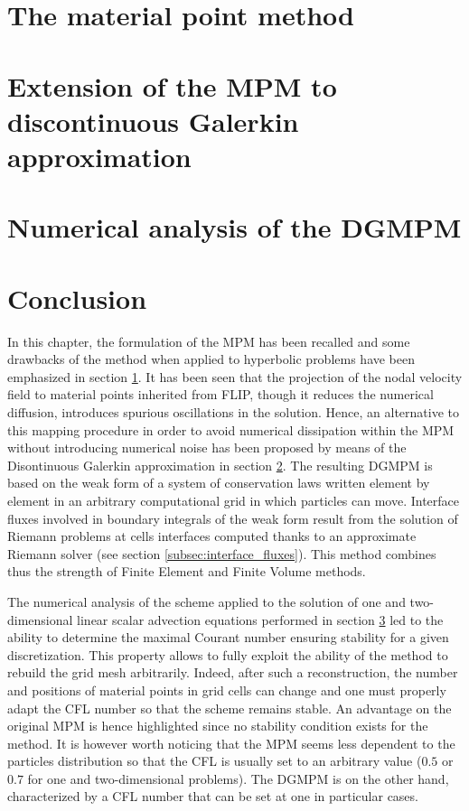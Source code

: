 \section{The material point method}
\label{sec:MPM}


\section{Extension of the MPM to discontinuous Galerkin approximation}
\label{sec:DGMPM}


\section{Numerical analysis of the DGMPM}
\label{sec:DGMPM_analysis}


\section*{Conclusion}
In this chapter, the formulation of the MPM has been recalled and some drawbacks of the method when applied to hyperbolic problems have been emphasized in section \ref{sec:MPM}. It has been seen that the projection of the nodal velocity field to material points inherited from FLIP, though it reduces the numerical diffusion, introduces spurious oscillations in the solution. Hence, an alternative to this mapping procedure in order to avoid numerical dissipation within the MPM without introducing numerical noise has been proposed by means of the Disontinuous Galerkin approximation in section \ref{sec:DGMPM}. The resulting DGMPM is based on the weak form of a system of conservation laws written element by element in an arbitrary computational grid in which particles can move. Interface fluxes involved in boundary integrals of the weak form result from the solution of Riemann problems at cells interfaces computed thanks to an approximate Riemann solver (see section \ref{subsec:interface_fluxes}). This method combines thus the strength of Finite Element and Finite Volume methods.

The numerical analysis of the scheme applied to the solution of one and two-dimensional linear scalar advection equations performed in section \ref{sec:DGMPM_analysis} led to the ability to determine the maximal Courant number ensuring stability for a given discretization.
This property allows to fully exploit the ability of the method to rebuild the grid mesh arbitrarily. Indeed, after such a reconstruction, the number and positions of material points in grid cells can change and one must properly adapt the CFL number so that the scheme remains stable. An advantage on the original MPM is hence highlighted since no stability condition exists for the method. It is however worth noticing that the MPM seems less dependent to the particles distribution so that the CFL is usually set to an arbitrary value ($0.5$ or $0.7$ for one and two-dimensional problems).
The DGMPM is on the other hand, characterized by a CFL number that can be set at one in particular cases.

